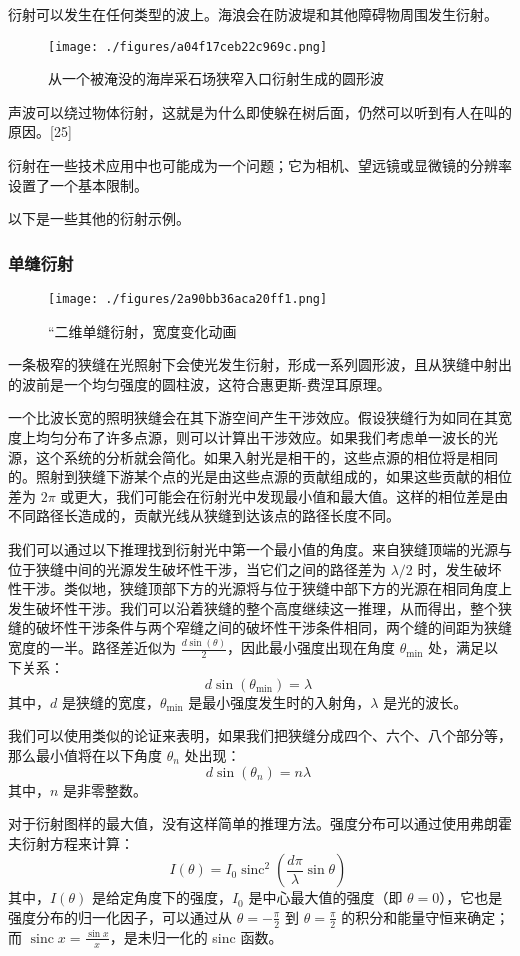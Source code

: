 衍射可以发生在任何类型的波上。海浪会在防波堤和其他障碍物周围发生衍射。
\begin{figure}[ht]
\centering
\texttt{[image: ./figures/a04f17ceb22c969c.png]}
\caption{从一个被淹没的海岸采石场狭窄入口衍射生成的圆形波} \label{fig_YS_14}
\end{figure}
声波可以绕过物体衍射，这就是为什么即使躲在树后面，仍然可以听到有人在叫的原因。[25]

衍射在一些技术应用中也可能成为一个问题；它为相机、望远镜或显微镜的分辨率设置了一个基本限制。

以下是一些其他的衍射示例。
\subsubsection{单缝衍射}
\begin{figure}[ht]
\centering
\texttt{[image: ./figures/2a90bb36aca20ff1.png]}
\caption{“二维单缝衍射，宽度变化动画} \label{fig_YS_15}
\end{figure}
一条极窄的狭缝在光照射下会使光发生衍射，形成一系列圆形波，且从狭缝中射出的波前是一个均匀强度的圆柱波，这符合惠更斯-费涅耳原理。

一个比波长宽的照明狭缝会在其下游空间产生干涉效应。假设狭缝行为如同在其宽度上均匀分布了许多点源，则可以计算出干涉效应。如果我们考虑单一波长的光源，这个系统的分析就会简化。如果入射光是相干的，这些点源的相位将是相同的。照射到狭缝下游某个点的光是由这些点源的贡献组成的，如果这些贡献的相位差为 \( 2\pi \) 或更大，我们可能会在衍射光中发现最小值和最大值。这样的相位差是由不同路径长造成的，贡献光线从狭缝到达该点的路径长度不同。

我们可以通过以下推理找到衍射光中第一个最小值的角度。来自狭缝顶端的光源与位于狭缝中间的光源发生破坏性干涉，当它们之间的路径差为 \( \lambda / 2 \) 时，发生破坏性干涉。类似地，狭缝顶部下方的光源将与位于狭缝中部下方的光源在相同角度上发生破坏性干涉。我们可以沿着狭缝的整个高度继续这一推理，从而得出，整个狭缝的破坏性干涉条件与两个窄缝之间的破坏性干涉条件相同，两个缝的间距为狭缝宽度的一半。路径差近似为 \( \frac{d \sin(\theta)}{2} \)，因此最小强度出现在角度 \( \theta_{\text{min}} \) 处，满足以下关系：
\[
d \sin(\theta_{\text{min}}) = \lambda~
\]
其中，\( d \) 是狭缝的宽度，\( \theta_{\text{min}} \) 是最小强度发生时的入射角，\( \lambda \) 是光的波长。

我们可以使用类似的论证来表明，如果我们把狭缝分成四个、六个、八个部分等，那么最小值将在以下角度 \( \theta_n \) 处出现：
\[
d \sin(\theta_n) = n\lambda~
\]
其中，\( n \) 是非零整数。

对于衍射图样的最大值，没有这样简单的推理方法。强度分布可以通过使用弗朗霍夫衍射方程来计算：
\[
I(\theta) = I_0 \operatorname{sinc}^2 \left( \frac{d\pi}{\lambda} \sin \theta \right)~
\]
其中，\( I(\theta) \) 是给定角度下的强度，\( I_0 \) 是中心最大值的强度（即 \( \theta = 0 \)），它也是强度分布的归一化因子，可以通过从 \( \theta = -\frac{\pi}{2} \) 到 \( \theta = \frac{\pi}{2} \) 的积分和能量守恒来确定；而 \( \operatorname{sinc} x = \frac{\sin x}{x} \)，是未归一化的 sinc 函数。

